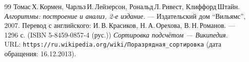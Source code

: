 \begin{thebibliography}{99}
Томас\,Х.\,Кормен, Чарльз\,И.\,Лейзерсон, Рональд\,Л.\,Ривест, Клиффорд\,Штайн.
{\itshape Алгоритмы: построение и анализ, 2-е издание.} --- Издательский дом \enquote{Вильямс}, 2007. Перевод с английского: И.\,В.\,Красиков, Н.\,А.\,Орехова, В.\,Н.\,Романов. --- 1296 с. (ISBN 5-8459-0857-4 (рус.))
{\itshape Сортировка подсчётом — Википедия.} \\URL: \texttt{https://ru.wikipedia.org/wiki/Поразрядная\_сортировка} (дата обращения: 16.12.2013).
\end{thebibliography}
\pagebreak